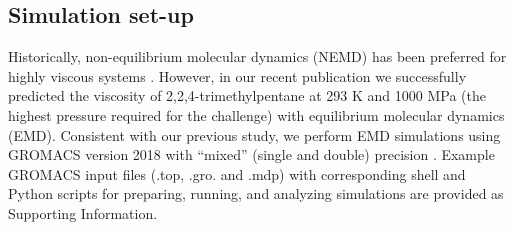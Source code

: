 \documentclass[preprint,review,12pt]{elsarticle}
\begin{document}
	
	
	
	
	\subsection{Simulation set-up}
		
	Historically, non-equilibrium molecular dynamics (NEMD) has been preferred for highly viscous systems \cite{McCabe2001,Liu2015}. However, in our recent publication we successfully predicted the viscosity of 2,2,4-trimethylpentane at 293 K and 1000 MPa (the highest pressure required for the challenge) with equilibrium molecular dynamics (EMD). Consistent with our previous study, we perform EMD simulations using GROMACS version 2018 with ``mixed'' (single and double) precision \cite{GROMACS_2018}. Example GROMACS input files (.top, .gro. and .mdp) with corresponding shell and Python scripts for preparing, running, and analyzing simulations are provided as Supporting Information.
	
	
	
\end{document}
